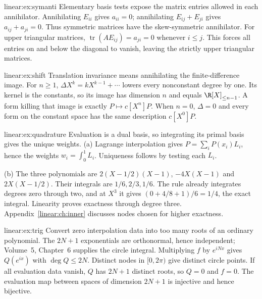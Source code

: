\begin{solution}{linear:ex:symanti}
\idea Elementary basis tests expose the matrix entries allowed in each annihilator.
\writeup Annihilating $E_{ii}$ gives $a_{ii}=0$; annihilating $E_{ij}+E_{ji}$ gives $a_{ij}+a_{ji}=0$. Thus symmetric matrices have the skew-symmetric annihilator. For upper triangular matrices, $\operatorname{tr}(AE_{ij})=a_{ji}=0$ whenever $i\le j$. This forces all entries on and below the diagonal to vanish, leaving the strictly upper triangular matrices.
\end{solution}
\begin{solution}{linear:ex:shift}
\idea Translation invariance means annihilating the finite-difference image.
\writeup For $n\ge1$, $\Delta X^k=kX^{k-1}+\cdots$ lowers every nonconstant degree by one. Its kernel is the constants, so its image has dimension $n$ and equals $\R[X]_{\le n-1}$. A form killing that image is exactly $P\mapsto c[X^n]P$. When $n=0$, $\Delta=0$ and every form on the constant space has the same description $c[X^0]P$.
\end{solution}
\begin{solution}{linear:ex:quadrature}
\idea Evaluation is a dual basis, so integrating its primal basis gives the unique weights.
\writeup (a) Lagrange interpolation gives $P=\sum_iP(x_i)L_i$, hence the weights $w_i=\int_0^1L_i$. Uniqueness follows by testing each $L_i$.

(b) The three polynomials are $2(X-1/2)(X-1)$, $-4X(X-1)$ and $2X(X-1/2)$. Their integrals are $1/6,2/3,1/6$. The rule already integrates degrees zero through two, and at $X^3$ it gives $(0+4/8+1)/6=1/4$, the exact integral. Linearity proves exactness through degree three. Appendix~\ref{linear:ch:inner} discusses nodes chosen for higher exactness.
\end{solution}
\begin{solution}{linear:ex:trig}
\idea Convert zero interpolation data into too many roots of an ordinary polynomial.
\writeup The $2N+1$ exponentials are orthonormal, hence independent; Volume~5, Chapter~6 supplies the circle integral. Multiplying $f$ by $e^{iNx}$ gives $Q(e^{ix})$ with $\deg Q\le2N$. Distinct nodes in $[0,2\pi)$ give distinct circle points. If all evaluation data vanish, $Q$ has $2N+1$ distinct roots, so $Q=0$ and $f=0$. The evaluation map between spaces of dimension $2N+1$ is injective and hence bijective.
\end{solution}
